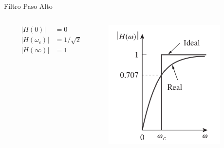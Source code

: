 \documentclass[xcolor={usenames,svgnames,dvipsnames}]{beamer}
\begin{document}
\begin{frame}[label={sec:orgfbd278c}]{Filtro Paso Alto}
\begin{columns}
\begin{column}{0.3\columnwidth}
\begin{align*}
  |H(0)| &= 0\\
  |H(\omega_c)| &= 1/\sqrt{2}\\
  |H(\infty)| &= 1
\end{align*}
\end{column}

\begin{column}{0.7\columnwidth}
\begin{center}
\includegraphics[width=.9\linewidth]{../figs/Filtro_PasoAlto.pdf}
\end{center}
\end{column}
\end{columns}
\end{frame}
\end{document}
